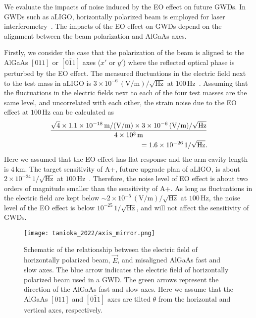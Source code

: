 We evaluate the impacts of noise induced by the EO effect on future GWDs.
In GWDs such as aLIGO, horizontally polarized beam is employed for laser interferometry~\cite{Aasi2015}.
The impacts of the EO effect on GWDs depend on the alignment between the beam polarization and AlGaAs axes.

Firstly, we consider the case that the polarization of the beam is aligned to the AlGaAs $[011]$ or $[0\bar{1}1]$ axes ($x'$ or $y'$) where the reflected optical phase is perturbed by the EO effect.
The measured fluctuations in the electric field next to the test mass in aLIGO is $3\times10^{-6}\, \mathrm{(V/m)/\sqrt{Hz}}$ at $100\, \mathrm{Hz}$~\cite{Buikema2020}.
Assuming that the fluctuations in the electric fields next to each of the four test masses are the same level, and uncorrelated with each other, the strain noise due to the EO effect at $100\, \mathrm{Hz}$ can be calculated as
\begin{align}
    \frac{\sqrt{4}\times1.1\times10^{-18}\, \mathrm{m/(V/m)}\times3\times10^{-6}\, \mathrm{(V/m)/\sqrt{Hz}}}{4\times10^3\, \mathrm{m}} \notag \\
    = 1.6\times10^{-26}\, \mathrm{1/\sqrt{Hz}}.
\end{align}
Here we assumed that the EO effect has flat response and the arm cavity length is $4\, \mathrm{km}$.
The target sensitivity of A+, future upgrade plan of aLIGO, is about $2\times10^{-24}\, \mathrm{1/{\sqrt{Hz}}}$ at $100\, \mathrm{Hz}$~\cite{Barsotti2018a+}.
Therefore, the noise level of EO effect is about two orders of magnitude smaller than the sensitivity of A+.
As long as fluctuations in the electric field are kept below $\sim2\times10^{-5}\, \mathrm{(V/m)/\sqrt{Hz}}$ at $100\, \mathrm{Hz}$, the noise level of the EO effect is below $10^{-25}\, \mathrm{1/\sqrt{Hz}}$, and will not affect the sensitivity of GWDs.


\begin{figure}[htbp]
    \centering
\texttt{[image: tanioka\_2022/axis\_mirror.png]}
\caption{
Schematic of the relationship between the electric field of horizontally polarized beam, $\vec{E}$, and misaligned AlGaAs fast and slow axes.
The blue arrow indicates the electric field of horizontally polarized beam used in a GWD.
The green arrows represent the direction of the AlGaAs fast and slow axes.
Here we assume that the AlGaAs $[011]$ and $[0\bar{1}1]$ axes are tilted $\theta$ from the horizontal and vertical axes, respectively.
}
\label{fig.tilt}
\end{figure}

